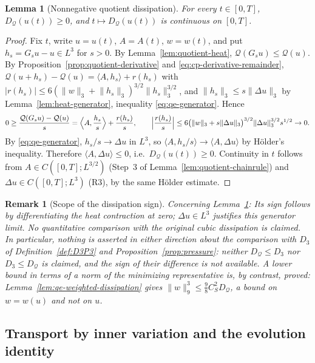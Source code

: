 \documentclass[11pt]{article}
\newtheorem{remark}[theorem]{Remark}
\newtheorem{lemma}[theorem]{Lemma}
\theoremstyle{definition}
\theoremstyle{plain}
\newcommand{\norm}[1]{\lVert #1\rVert}
\begin{document}
\begin{lemma}[Nonnegative quotient dissipation]\label{lem:quotient-heatsign}
For every $t\in[0,T]$, $D_{\mathcal Q}(u(t))\ge0$, and
$t\mapsto D_{\mathcal Q}(u(t))$ is continuous on $[0,T]$.
\end{lemma}

\begin{proof}
Fix $t$, write $u=u(t)$, $A=A(t)$, $w=w(t)$, and put $h_s=G_su-u\in L^3$
for $s>0$.  By Lemma~\ref{lem:quotient-heat}, $\mathcal Q(G_su)\le\mathcal Q(u)$.
By Proposition~\ref{prop:quotient-derivative} and
\eqref{eq:cp-derivative-remainder},
$\mathcal Q(u+h_s)-\mathcal Q(u)=\langle A,h_s\rangle+r(h_s)$ with
$|r(h_s)|\le6(\norm w_3+\norm{h_s}_3)^{3/2}\norm{h_s}_3^{3/2}$, and
$\norm{h_s}_3\le s\norm{\Delta u}_3$ by Lemma~\ref{lem:heat-generator},
inequality \eqref{eq:qe-generator}.  Hence
\[
 0\ge\frac{\mathcal Q(G_su)-\mathcal Q(u)}s
 =\Bigl\langle A,\frac{h_s}s\Bigr\rangle+\frac{r(h_s)}s,
 \qquad
 \Bigl|\frac{r(h_s)}s\Bigr|
 \le6\bigl(\norm w_3+s\norm{\Delta u}_3\bigr)^{3/2}\norm{\Delta u}_3^{3/2}s^{1/2}\to0 .
\]
By \eqref{eq:qe-generator}, $h_s/s\to\Delta u$ in $L^3$, so
$\langle A,h_s/s\rangle\to\langle A,\Delta u\rangle$ by H\"older's
inequality.  Therefore $\langle A,\Delta u\rangle\le0$, i.e.\
$D_{\mathcal Q}(u(t))\ge0$.  Continuity in $t$ follows from
$A\in C([0,T];L^{3/2})$ (Step~3 of Lemma~\ref{lem:quotient-chainrule}) and
$\Delta u\in C([0,T];L^3)$ (R3), by the same H\"older estimate.
\end{proof}

\begin{remark}[Scope of the dissipation sign]\label{rem:qe-heatsign-scope}
Concerning Lemma~\ref{lem:quotient-heatsign}:
Its sign follows by differentiating the heat contraction at zero;
$\Delta u\in L^3$ justifies this generator limit.  No quantitative
comparison with the original cubic dissipation is claimed.  In particular, nothing is asserted in either direction about the
comparison with $D_3$ of Definition~\ref{def:D3P3} and
Proposition~\ref{prop:pressure}: neither $D_{\mathcal Q}\le D_3$ nor
$D_3\le D_{\mathcal Q}$ is claimed, and the sign of their difference is
not available.  A lower bound in terms of a norm of the minimizing
representative is, by contrast, proved:
Lemma~\ref{lem:qe-weighted-dissipation} gives
$\norm{w}_9^3\le\frac98C_S^2D_{\mathcal Q}$, a bound on $w=w(u)$ and not
on $u$.
\end{remark}

\subsection{Transport by inner variation and the evolution identity}
\label{subsec:qe-transport}
\end{document}
